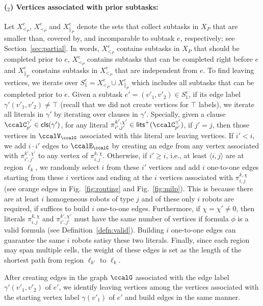 \documentclass[Afour,sageh,times]{sagej}
\newcounter{mycounter}
\newcommand{\clause}[1]{\mathsf{cls}(#1)}
\newcommand{\ag}[2]{\langle#1,#2\rangle}
\renewcommand{\ap}[3]{\mathcal{\pi}_{{#1},{#2}}^{#3}}
\begin{document}
\paragraph{($_2$) Vertices associated with prior subtasks:}\label{sec:b} Let $X^e_{<_{P}}$, $X^e_{\prec_{P}}$ and $X^e_{\|_{P}}$ denote the sets that collect subtasks in $X_{P}$ that are  smaller than, covered by, and incomparable to subtask $e$, respectively; see Section~\ref{sec:partial}. In words, $X^e_{<_{P}}$ contains subtasks in $X_P$ that should be completed prior to $e$, $X^e_{\prec_{P}}$ contains subtasks that can be completed right before $e$  and $X^e_{\|_{P}}$ constains subtasks in  $X^e_{<_P}$ that are independent from $e$. To find leaving vertices, we iterate over $S_1^e = X^e_{<_{P}} \cup X^e_{\|_{P}}$ which includes all subtasks that can be completed prior to $e$.
Given a subtask $e' = (v'_1, v'_2) \in S_1^e$, if its edge label $\gamma'(v'_1, v'_2) \not=\top$ (recall that we did not create vertices for $\top$ labels), we iterate all literals in $\gamma'$ by iterating over clauses in $\gamma'$. Specially, given a clause $\ccalC^{\gamma'}_{p'} \in \clause{\gamma'}$, for any literal $\ap{i'}{j'}{k',\chi'} \in\mathsf{lits}^+(\ccalC^{\gamma'}_{p'})$, if $j'=j$, then those vertices in $\ccalV_\ccalG$ associated with this literal are leaving vertices. If $i'<i$, we add $i\cdot  i'$ edges to $\ccalE_\ccalG$ by creating an edge from any vertex associated with $\ap{i'}{j'}{k',\chi'}$ to any vertex of $\ap{i}{j}{k,\chi}$. Otherwise, if $i' \geq  i$, i.e., at least $\ag{i}{j}$ are at region $\ell_k$, we randomly select $i$ from these $i'$ vertices and add $i$ one-to-one edges starting from these $i$ vertices and ending at the $i$ vertices associated with $\ap{i}{j}{k,\chi}$ (see orange edges in Fig.~\ref{fig:routing} and Fig.~\ref{fig:milp}). This is because there are at least $i$ homogeneous robots of type $j$ and of these only $i$ robots are required, if suffices to build $i$ one-to-one edges. Furthermore, if $\chi=\chi'\neq0$, then literals $\ap{i}{j}{k,\chi}$ and $\ap{i'}{j'}{k',\chi'}$ must have the same number of vertices if formula $\phi$ is a valid formula (see Definition~\ref{defn:valid}). Building $i$ one-to-one edges can guarantee the same  $i$ robots satisy these two literals. Finally, since each region may span multiple cells, the weight of these edges is set as the length of the shortest path from region  $\ell_{k'}$ to $\ell_k$.

After creating edges in the graph $\ccalG$ associated with the edge label  $\gamma'(v'_1,v'_2)$ of $e'$, we identify  leaving vertices  among the vertices associated with the starting vertex label $\gamma(v'_1)$ of $e'$ and build edges in the same manner. %
\end{document}
